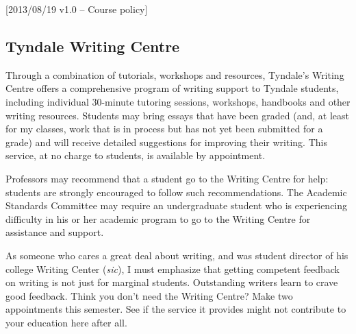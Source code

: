 [2013/08/19 v1.0 -- Course policy]

\subsection{Tyndale Writing Centre}
\label{writing_centre}

Through a combination of tutorials, workshops and resources, Tyndale's Writing
Centre offers a comprehensive program of writing support to Tyndale students,
including individual 30-minute tutoring sessions, workshops, handbooks and
other writing resources. Students may bring essays that have been graded (and,
at least for my classes, work that is in process but has not yet been submitted
for a grade) and will receive detailed suggestions for improving their writing.
This service, at no charge to students, is available by appointment.

Professors may recommend that a student go to the Writing Centre for help:
students are strongly encouraged to follow such recommendations. The Academic
Standards Committee may require an undergraduate student who is experiencing
difficulty in his or her academic program to go to the Writing Centre for
assistance and support.

As someone who cares a great deal about writing, and was student director
of his college Writing Center (\emph{sic}), I must emphasize that getting
competent feedback on writing is not just for marginal students. Outstanding
writers learn to crave good feedback. Think you don't need the Writing Centre?
Make two appointments this semester. See if the service it provides might not
contribute to your education here after all.
